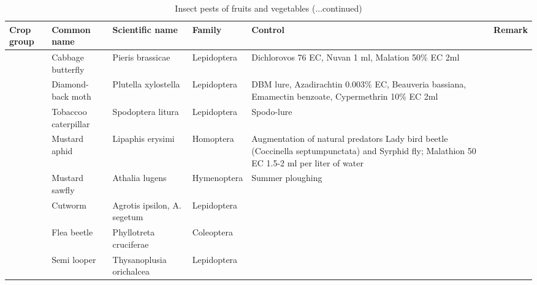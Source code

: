 \documentclass[10pt,dvipsnames,ignorenonframetext,aspectratio=169]{beamer}
\begin{document}
\begin{frame}{}
\protect\hypertarget{section-17}{}
\begin{table}

\caption{\label{tab:unnamed-chunk-5}Insect pests of fruits and vegetables (...continued)}
\centering
\fontsize{4}{6}\selectfont
\begin{tabular}[t]{>{\raggedright\arraybackslash}p{6em}>{\raggedright\arraybackslash}p{12em}>{\raggedright\arraybackslash}p{14em}>{\raggedright\arraybackslash}p{14em}>{\raggedright\arraybackslash}p{14em}>{\raggedright\arraybackslash}p{8em}}
\toprule
Crop group & Common name & Scientific name & Family & Control & Remark\\
\midrule
 & Cabbage butterfly & Pieris brassicae & Lepidoptera & Dichlorovos 76 EC, Nuvan 1 ml, Malation 50\% EC 2ml & \\
\cmidrule{2-6}
 & Diamond-back moth & Plutella xylostella & Lepidoptera & DBM lure, Azadirachtin 0.003\% EC, Beauveria bassiana, Emamectin benzoate, Cypermethrin 10\% EC 2ml & \\
\cmidrule{2-6}
 & Tobaccoo caterpillar & Spodoptera litura & Lepidoptera & Spodo-lure & \\
\cmidrule{2-6}
 & Mustard aphid & Lipaphis erysimi & Homoptera & Augmentation of natural predators Lady bird beetle (Coccinella septumpunctata) and Syrphid fly; Malathion 50 EC 1.5-2 ml per liter of water & \\
\cmidrule{2-6}
 & Mustard sawfly & Athalia lugens & Hymenoptera & Summer ploughing & \\
\cmidrule{2-6}
 & Cutworm & Agrotis ipsilon, A. segetum & Lepidoptera &  & \\
\cmidrule{2-6}
 & Flea beetle & Phyllotreta cruciferae & Coleoptera &  & \\
\cmidrule{2-6}
\multirow{-8}{6em}{\raggedright\arraybackslash Cruciferous vegetables} & Semi looper & Thysanoplusia orichalcea & Lepidoptera &  & \\
\bottomrule
\end{tabular}
\end{table}
\end{frame}
\end{document}

